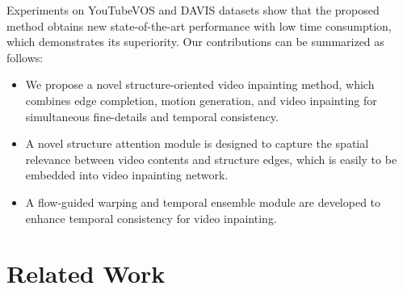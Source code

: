 %
Experiments on YouTubeVOS and DAVIS datasets show that the proposed method obtains new state-of-the-art performance with low time consumption, which demonstrates its superiority.
%
Our contributions can be summarized as follows:
\begin{itemize}
	\item We propose a novel structure-oriented video inpainting method, which combines edge completion, motion generation, and video inpainting for simultaneous fine-details and temporal consistency.
	\item A novel structure attention module is designed to capture the spatial relevance between video contents and structure edges, which is easily to be embedded into video inpainting network. %
	\item A flow-guided warping and temporal ensemble module are developed to enhance temporal consistency for video inpainting.%
	
	
	
\end{itemize}





\section{Related Work}
